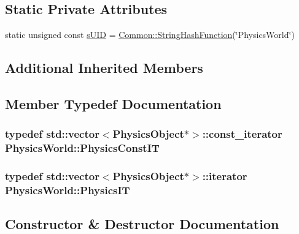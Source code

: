 \subsection*{Static Private Attributes}
\begin{DoxyCompactItemize}
\item 
static unsigned const \hyperlink{classPhysicsWorld_ac6079c51e7409d83a44c61cd346c7917}{s\+U\+ID} = \hyperlink{namespaceCommon_a994c43a8ea7b03968186a635687a6521}{Common\+::\+String\+Hash\+Function}(\char`\"{}Physics\+World\char`\"{})
\end{DoxyCompactItemize}
\subsection*{Additional Inherited Members}


\subsection{Member Typedef Documentation}
\subsubsection[{\texorpdfstring{Physics\+Const\+IT}{PhysicsConstIT}}]{\setlength{\rightskip}{0pt plus 5cm}typedef std\+::vector$<${\bf Physics\+Object}$\ast$$>$\+::const\+\_\+iterator {\bf Physics\+World\+::\+Physics\+Const\+IT}}\hypertarget{classPhysicsWorld_ab3617a37c62ed3fcb77f1851a26f2001}{}\label{classPhysicsWorld_ab3617a37c62ed3fcb77f1851a26f2001}
\subsubsection[{\texorpdfstring{Physics\+IT}{PhysicsIT}}]{\setlength{\rightskip}{0pt plus 5cm}typedef std\+::vector$<${\bf Physics\+Object}$\ast$$>$\+::iterator {\bf Physics\+World\+::\+Physics\+IT}}\hypertarget{classPhysicsWorld_ada3fdb31fba17f91c9390b6ac0d62f8b}{}\label{classPhysicsWorld_ada3fdb31fba17f91c9390b6ac0d62f8b}


\subsection{Constructor \& Destructor Documentation}
